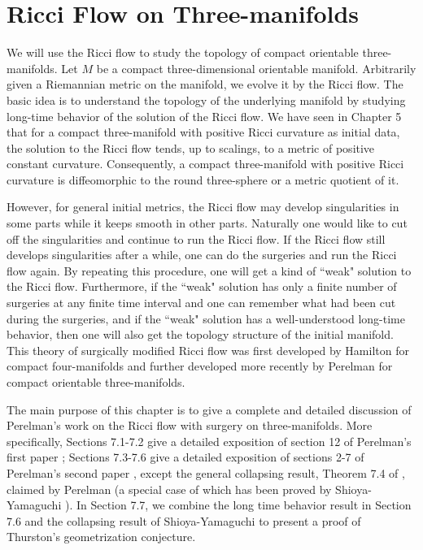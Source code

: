 
\chapter{Ricci Flow on Three-manifolds}
\label{chap:cz-three-manifold-ricci-flow}

\bigskip
We will use the Ricci flow to study the topology of compact
orientable three-manifolds. Let $M$ be a compact three-dimensional
orientable manifold. Arbitrarily given a Riemannian metric on the
manifold, we evolve it by the Ricci flow. The basic idea is to
understand the topology of the underlying manifold by studying
long-time behavior of the solution of the Ricci flow. We have seen
in Chapter 5 that for a compact three-manifold with positive Ricci
curvature as initial data, the solution to the Ricci flow tends,
up to scalings, to a metric of positive constant curvature.
Consequently, a compact three-manifold with positive Ricci
curvature is diffeomorphic to the round three-sphere or a metric
quotient of it.

However, for general initial metrics, the Ricci flow may develop
singularities in some parts while it keeps smooth in other parts.
Naturally one would like to cut off the singularities and continue
to run the Ricci flow. If the Ricci flow still develops
singularities after a while, one can do the surgeries and run the
Ricci flow again. By repeating this procedure, one will get a kind
of ``weak" solution to the Ricci flow. Furthermore, if the ``weak"
solution has only a finite number of surgeries at any finite time
interval and one can remember what had been cut during the
surgeries, and if the ``weak" solution has a well-understood
long-time behavior, then one will also get the topology structure
of the initial manifold. This theory of surgically modified Ricci
flow was first developed by Hamilton \cite{Ha97} for compact
four-manifolds and further developed more recently by Perelman
\cite{P2} for compact orientable three-manifolds.

The main purpose of this chapter is to give a complete and
detailed discussion of Perelman's work on the Ricci flow with
surgery on three-manifolds. More specifically, Sections 7.1-7.2
give a detailed exposition of section 12 of Perelman's first paper
\cite{P1}; Sections 7.3-7.6 give a detailed exposition of sections
2-7 of Perelman's second paper \cite{P2}, except the general
collapsing result, Theorem 7.4 of \cite{P2}, claimed by Perelman
(a special case of which has been proved by Shioya-Yamaguchi
\cite{ShY}). In Section 7.7, we combine the long time behavior
result in Section 7.6 and the collapsing result of
Shioya-Yamaguchi \cite{ShY} to present a proof of Thurston's
geometrization conjecture.



